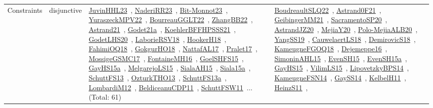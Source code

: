 {\begin{longtable}{lp{3cm}>{\raggedright\arraybackslash}p{6cm}>{\raggedright\arraybackslash}p{6cm}>{\raggedright\arraybackslash}p{8cm}}
Constraints & disjunctive & \href{works/JuvinHHL23.pdf}{JuvinHHL23}~\cite{JuvinHHL23}, \href{works/NaderiRR23.pdf}{NaderiRR23}~\cite{NaderiRR23}, \href{works/Bit-Monnot23.pdf}{Bit-Monnot23}~\cite{Bit-Monnot23}, \href{works/YuraszeckMPV22.pdf}{YuraszeckMPV22}~\cite{YuraszeckMPV22}, \href{works/BourreauGGLT22.pdf}{BourreauGGLT22}~\cite{BourreauGGLT22}, \href{works/ZhangBB22.pdf}{ZhangBB22}~\cite{ZhangBB22}, \href{works/Astrand21.pdf}{Astrand21}~\cite{Astrand21}, \href{works/Godet21a.pdf}{Godet21a}~\cite{Godet21a}, \href{works/KoehlerBFFHPSSS21.pdf}{KoehlerBFFHPSSS21}~\cite{KoehlerBFFHPSSS21}, \href{works/GodetLHS20.pdf}{GodetLHS20}~\cite{GodetLHS20}, \href{works/LaborieRSV18.pdf}{LaborieRSV18}~\cite{LaborieRSV18}, \href{works/HookerH18.pdf}{HookerH18}~\cite{HookerH18}, \href{works/FahimiOQ18.pdf}{FahimiOQ18}~\cite{FahimiOQ18}, \href{works/GokgurHO18.pdf}{GokgurHO18}~\cite{GokgurHO18}, \href{works/NattafAL17.pdf}{NattafAL17}~\cite{NattafAL17}, \href{works/Pralet17.pdf}{Pralet17}~\cite{Pralet17}, \href{works/MossigeGSMC17.pdf}{MossigeGSMC17}~\cite{MossigeGSMC17}, \href{works/FontaineMH16.pdf}{FontaineMH16}~\cite{FontaineMH16}, \href{works/GoelSHFS15.pdf}{GoelSHFS15}~\cite{GoelSHFS15}, \href{works/GayHS15a.pdf}{GayHS15a}~\cite{GayHS15a}, \href{works/MelgarejoLS15.pdf}{MelgarejoLS15}~\cite{MelgarejoLS15}, \href{works/SialaAH15.pdf}{SialaAH15}~\cite{SialaAH15}, \href{works/Siala15a.pdf}{Siala15a}~\cite{Siala15a}, \href{works/SchuttFS13.pdf}{SchuttFS13}~\cite{SchuttFS13}, \href{works/OzturkTHO13.pdf}{OzturkTHO13}~\cite{OzturkTHO13}, \href{works/SchuttFS13a.pdf}{SchuttFS13a}~\cite{SchuttFS13a}, \href{works/LombardiM12.pdf}{LombardiM12}~\cite{LombardiM12}, \href{works/BeldiceanuCDP11.pdf}{BeldiceanuCDP11}~\cite{BeldiceanuCDP11}, \href{works/SchuttFSW11.pdf}{SchuttFSW11}~\cite{SchuttFSW11}... (Total: 61) & \href{works/BoudreaultSLQ22.pdf}{BoudreaultSLQ22}~\cite{BoudreaultSLQ22}, \href{works/Astrand0F21.pdf}{Astrand0F21}~\cite{Astrand0F21}, \href{works/GeibingerMM21.pdf}{GeibingerMM21}~\cite{GeibingerMM21}, \href{works/SacramentoSP20.pdf}{SacramentoSP20}~\cite{SacramentoSP20}, \href{works/AstrandJZ20.pdf}{AstrandJZ20}~\cite{AstrandJZ20}, \href{works/MejiaY20.pdf}{MejiaY20}~\cite{MejiaY20}, \href{works/Polo-MejiaALB20.pdf}{Polo-MejiaALB20}~\cite{Polo-MejiaALB20}, \href{works/YangSS19.pdf}{YangSS19}~\cite{YangSS19}, \href{works/CauwelaertLS18.pdf}{CauwelaertLS18}~\cite{CauwelaertLS18}, \href{works/DemirovicS18.pdf}{DemirovicS18}~\cite{DemirovicS18}, \href{works/KameugneFGOQ18.pdf}{KameugneFGOQ18}~\cite{KameugneFGOQ18}, \href{works/Dejemeppe16.pdf}{Dejemeppe16}~\cite{Dejemeppe16}, \href{works/SimoninAHL15.pdf}{SimoninAHL15}~\cite{SimoninAHL15}, \href{works/EvenSH15.pdf}{EvenSH15}~\cite{EvenSH15}, \href{works/EvenSH15a.pdf}{EvenSH15a}~\cite{EvenSH15a}, \href{works/GayHS15.pdf}{GayHS15}~\cite{GayHS15}, \href{works/VilimLS15.pdf}{VilimLS15}~\cite{VilimLS15}, \href{works/LipovetzkyBPS14.pdf}{LipovetzkyBPS14}~\cite{LipovetzkyBPS14}, \href{works/KameugneFSN14.pdf}{KameugneFSN14}~\cite{KameugneFSN14}, \href{works/GaySS14.pdf}{GaySS14}~\cite{GaySS14}, \href{works/KelbelH11.pdf}{KelbelH11}~\cite{KelbelH11}, \href{works/HeinzS11.pdf}{HeinzS11}~\cite{HeinzS11}, 
\end{longtable}}
